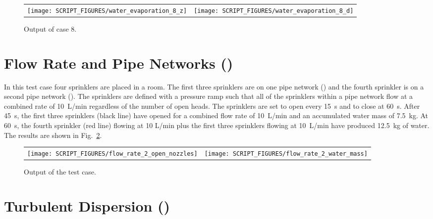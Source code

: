 \documentclass[11pt]{book}
\begin{document}
\begin{figure}[h!]
\noindent
\begin{tabular*}{\textwidth}{l@{\extracolsep{\fill}}r}
\texttt{[image: SCRIPT\_FIGURES/water\_evaporation\_8\_z]} &
\texttt{[image: SCRIPT\_FIGURES/water\_evaporation\_8\_d]}
\end{tabular*}
\caption[Sample case ]{Output of  case 8.}
\label{water_evaporation_8_plots}
\end{figure}

\clearpage

\section{Flow Rate and Pipe Networks (\texorpdfstring{{}}{flow\_rate\_2}) }
\label{flow_rate_2}

In this test case four sprinklers are placed in a room.  The first three sprinklers are on one pipe network () and the fourth sprinkler is on a second pipe network ().  The sprinklers are defined with a pressure ramp such that all of the sprinklers within a pipe network flow at a combined rate of 10~L/min regardless of the number of open heads.  The sprinklers are set to open every 15~s and to close at 60~s.  After 45~s, the first three sprinklers (black line) have opened for a combined flow rate of 10~L/min and an accumulated water mass of 7.5~kg.  At 60~s, the fourth sprinkler (red line) flowing at 10 L/min plus the first three sprinklers flowing at 10~L/min have produced 12.5~kg of water. The results are shown in Fig.~\ref{flow_rate_2_figure}.

\begin{figure}[ht]
\begin{tabular*}{\textwidth}{lr}
\texttt{[image: SCRIPT\_FIGURES/flow\_rate\_2\_open\_nozzles]} &
\texttt{[image: SCRIPT\_FIGURES/flow\_rate\_2\_water\_mass]}
\end{tabular*}
\caption[The  case]{Output of the  test case.}
\label{flow_rate_2_figure}
\end{figure}


\clearpage

\section{Turbulent Dispersion (\texorpdfstring{{}}{random\_walk}) }
\label{turbulent_dispersion}
\label{random_walk}
\end{document}
